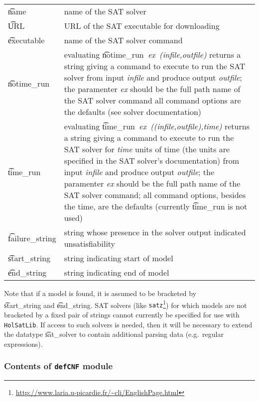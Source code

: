 \begin{tabular}{lp{3.75in}}
\t{name} & name of the SAT solver \\

\t{URL} & URL of the SAT executable for downloading\\

\t{executable} &
name of the SAT solver command\\

\t{notime\_run} &
evaluating \t{notime\_run}{\it~ex~(infile,outfile)} returns a string giving a command to execute to run the SAT solver from input {\it infile} and produce output {\it outfile}; the paramenter {\it ex} should be the full path name of the  SAT solver command all command options are the defaults (see solver documentation)\\

\t{time\_run} &
evaluating \t{time\_run}{\it~ex~((infile,outfile),time)} returns a string giving a command to execute to run the SAT solver for {\it time} units of time (the units are specified in the SAT solver's documentation) from input {\it infile} and produce output {\it outfile}; the paramenter {\it ex} should be the full path name of the  SAT solver command; all command options, besides the time, are the defaults (currently \t{time\_run} is not used)\\

\t{failure\_string} & string whose presence in the solver output indicated unsatisfiability\\


\t{start\_string} &
string indicating start of model \\


\t{end\_string} &
string indicating end of model \\

\end{tabular}

\medskip

Note that if a model is found, it is assumed to be bracketed
by \\ \t{start\_string} and \t{end\_string}. SAT solvers 
(like {\tt satz}\footnote{\url{http://www.laria.u-picardie.fr/~cli/EnglishPage.html}})
for which models are not bracketed by a fixed pair of strings cannot currently
be specified for use with {\tt HolSatLib}. If access to such solvers is needed, then
it will be necessary to extend the datatype \t{sat\_solver} to contain
additional parsing data (e.g.~regular expressions).

\subsubsection{Contents of {\tt defCNF} module}

